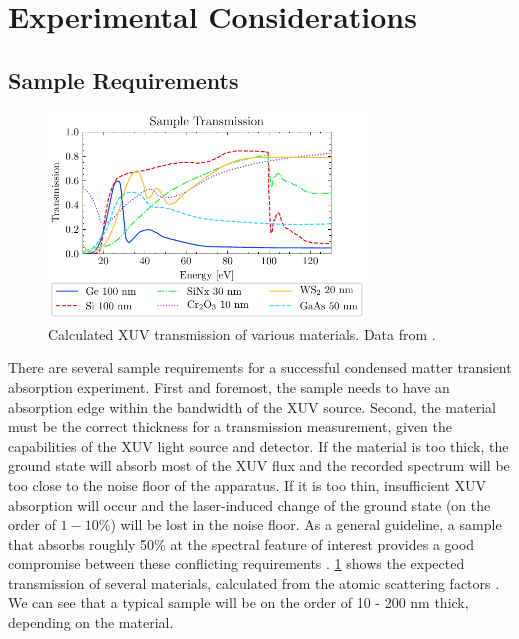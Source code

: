 \section{Experimental Considerations}

\subsection{Sample Requirements}

\begin{figure}
	\centering
	\includegraphics[width=0.75\textwidth]{figures/chap4/Sample_transmission_CXRO.pdf}
	\caption{Calculated XUV transmission of various materials. Data from \cite{gulliksonCXROXRayInteractions}.}
	\label{fig:Sample_trans_CXRO}
\end{figure}

There are several sample requirements for a successful condensed matter transient absorption experiment. First and foremost, the sample needs to have an absorption edge within the bandwidth of the XUV source. Second, the material must be the correct thickness for a transmission measurement, given the capabilities of the XUV light source and detector. If the material is too thick, the ground state will absorb most of the XUV flux and the recorded spectrum will be too close to the noise floor of the apparatus. If it is too thin, insufficient XUV absorption will occur and the laser-induced change of the ground state (on the order of $1-10\%$) will be lost in the noise floor. As a general guideline, a sample that absorbs roughly 50\% at the spectral feature of interest provides a good compromise between these conflicting requirements \cite{geneauxTransientAbsorptionSpectroscopy2019}. \cref{fig:Sample_trans_CXRO} shows the expected transmission of several materials, calculated from the atomic scattering factors \cite{gulliksonCXROXRayInteractions}. We can see that a typical sample will be on the order of 10 - 200 nm thick, depending on the material.

